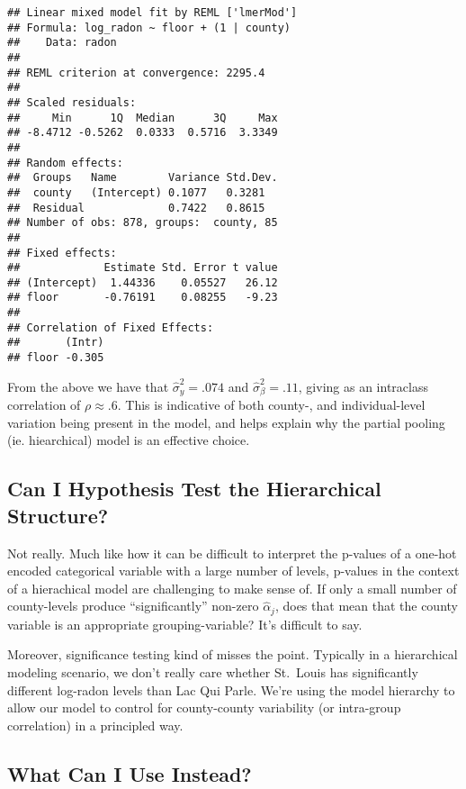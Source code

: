 \documentclass[
]{article}
\begin{document}
\begin{verbatim}
## Linear mixed model fit by REML ['lmerMod']
## Formula: log_radon ~ floor + (1 | county)
##    Data: radon
## 
## REML criterion at convergence: 2295.4
## 
## Scaled residuals: 
##     Min      1Q  Median      3Q     Max 
## -8.4712 -0.5262  0.0333  0.5716  3.3349 
## 
## Random effects:
##  Groups   Name        Variance Std.Dev.
##  county   (Intercept) 0.1077   0.3281  
##  Residual             0.7422   0.8615  
## Number of obs: 878, groups:  county, 85
## 
## Fixed effects:
##             Estimate Std. Error t value
## (Intercept)  1.44336    0.05527   26.12
## floor       -0.76191    0.08255   -9.23
## 
## Correlation of Fixed Effects:
##       (Intr)
## floor -0.305
\end{verbatim}

From the above we have that \(\hat \sigma_y^2 = .074\) and
\(\hat \sigma_{\beta}^2=.11\), giving as an intraclass correlation of
\(\rho \approx .6\). This is indicative of both county-, and
individual-level variation being present in the model, and helps explain
why the partial pooling (ie. hiearchical) model is an effective choice.

\hypertarget{can-i-hypothesis-test-the-hierarchical-structure}{%
\subsection{Can I Hypothesis Test the Hierarchical
Structure?}\label{can-i-hypothesis-test-the-hierarchical-structure}}

Not really. Much like how it can be difficult to interpret the p-values
of a one-hot encoded categorical variable with a large number of levels,
p-values in the context of a hierachical model are challenging to make
sense of. If only a small number of county-levels produce
``significantly'' non-zero \(\hat \alpha_j\), does that mean that the
county variable is an appropriate grouping-variable? It's difficult to
say.

Moreover, significance testing kind of misses the point. Typically in a
hierarchical modeling scenario, we don't really care whether St.~Louis
has significantly different log-radon levels than Lac Qui Parle. We're
using the model hierarchy to allow our model to control for
county-county variability (or intra-group correlation) in a principled
way.

\hypertarget{what-can-i-use-instead}{%
\subsection{What Can I Use Instead?}\label{what-can-i-use-instead}}
\end{document}
